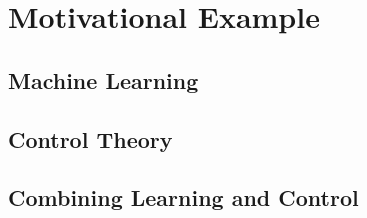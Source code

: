\section{Motivational Example}
\label{sec:example}



\subsection{Machine Learning}



\subsection{Control Theory}



\subsection{Combining Learning and Control}

